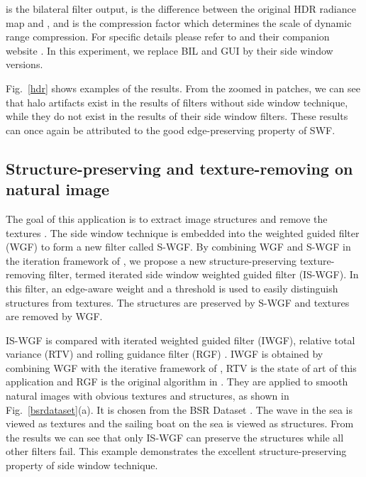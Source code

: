 \documentclass[10pt,twocolumn,letterpaper]{article}
\begin{document}
 is the bilateral filter output,  is the difference between the original HDR radiance map and , and  is the compression factor which determines the scale of dynamic range compression. For specific details please refer to \cite{fbf} and their companion website \cite{eh3}. In this experiment, we replace BIL and GUI by their side window versions. 

Fig.~\ref{hdr} shows examples of the results. From the zoomed in patches, we can see that halo artifacts exist in the results of filters without side window technique, while they do not exist in the results of their side window filters. These results can once again be attributed to the good edge-preserving property of SWF.
\subsection{Structure-preserving and texture-removing on natural image}
The goal of this application is to extract image structures and remove the textures \cite{rtv}. The side window technique is embedded into the weighted guided filter (WGF) \cite{wgf} to form a new filter called S-WGF. By combining WGF and S-WGF in the iteration framework of \cite{rgf}, we propose a new structure-preserving texture-removing filter, termed iterated side window weighted guided filter (IS-WGF). In this filter, an edge-aware weight \cite{wgf} and a threshold  is used to easily distinguish structures from textures. The structures are preserved by S-WGF and textures are removed by WGF. 

IS-WGF is compared with iterated weighted guided filter (IWGF), relative total variance (RTV) \cite{rtv} and rolling guidance filter (RGF) \cite{rgf}. IWGF is obtained by combining WGF with the iterative framework of \cite{rgf}, RTV is the state of art of this application and RGF is the original algorithm in \cite{rgf}. They are applied to smooth natural images with obvious textures and structures, as shown in Fig.~\ref{bsrdataset}(a). It is chosen from the BSR Dataset \cite{bsr}. The wave in the sea is viewed as textures and the sailing boat on the sea is viewed as structures. From the results we can see that only IS-WGF can preserve the structures while all other filters fail. This example demonstrates the excellent structure-preserving property of side window technique.
\end{document}

